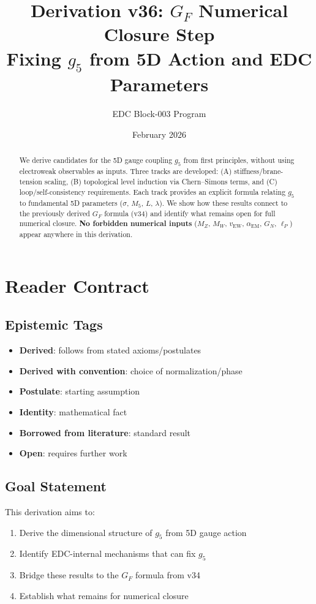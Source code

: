 \documentclass[11pt,a4paper]{article}
\title{\textbf{Derivation v36: $G_F$ Numerical Closure Step} \\[0.5em]
\large Fixing $g_5$ from 5D Action and EDC Parameters}
\author{EDC Block-003 Program}
\date{February 2026}
\newcommand{\tagD}{\textcolor{blue!70!black}{[D]}}
\newcommand{\tagDc}{\textcolor{blue!50!black}{[Dc]}}
\newcommand{\tagP}{\textcolor{green!50!black}{[P]}}
\newcommand{\tagI}{\textcolor{gray}{[I]}}
\newcommand{\tagBL}{\textcolor{purple}{[BL]}}
\newcommand{\tagOPEN}{\textcolor{red!70!black}{[OPEN]}}
\begin{document}
\maketitle

\begin{abstract}
We derive candidates for the 5D gauge coupling $g_5$ from first principles,
without using electroweak observables as inputs. Three tracks are developed:
(A) stiffness/brane-tension scaling, (B) topological level induction via
Chern--Simons terms, and (C) loop/self-consistency requirements. Each track
provides an explicit formula relating $g_5$ to fundamental 5D parameters
($\sigma$, $M_5$, $L$, $\lambda$). We show how these results connect to the
previously derived $G_F$ formula (v34) and identify what remains open for
full numerical closure. \textbf{No forbidden numerical inputs} ($M_Z$, $M_W$,
$v_{\text{EW}}$, $\alpha_{\text{EM}}$, $G_N$, $\ell_P$) appear anywhere in
this derivation.
\end{abstract}

\tableofcontents
\newpage

\section{Reader Contract}

\subsection{Epistemic Tags}
\begin{itemize}[leftmargin=2cm]
    \item[\tagD] \textbf{Derived}: follows from stated axioms/postulates
    \item[\tagDc] \textbf{Derived with convention}: choice of normalization/phase
    \item[\tagP] \textbf{Postulate}: starting assumption
    \item[\tagI] \textbf{Identity}: mathematical fact
    \item[\tagBL] \textbf{Borrowed from literature}: standard result
    \item[\tagOPEN] \textbf{Open}: requires further work
\end{itemize}

\subsection{Goal Statement}
This derivation aims to:
\begin{enumerate}
    \item Derive the dimensional structure of $g_5$ from 5D gauge action
    \item Identify EDC-internal mechanisms that can fix $g_5$
    \item Bridge these results to the $G_F$ formula from v34
    \item Establish what remains for numerical closure
\end{enumerate}
\end{document}
